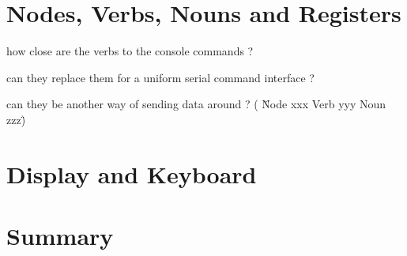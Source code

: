 \section{Nodes, Verbs, Nouns and Registers}


how close are the verbs to the console commands ?

can they replace them for a uniform serial command interface ?

can they be another way of sending data around ? ( \"Node xxx Verb yyy Noun zzz\" )


\section{Display and Keyboard}


\section{Summary}
